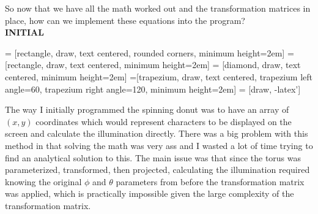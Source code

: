 \documentclass{article}
\begin{document}
\begin{flushleft}
So now that we have all the math worked out and the transformation matrices in place, how can we implement these equations into the program? \\
\textbf{INITIAL} \\
\end{flushleft}
\centering
{} = [rectangle, draw, text centered, rounded corners, minimum height=2em]
 = [rectangle, draw, text centered, minimum height=2em]
 = [diamond, draw, text centered, minimum height=2em]
=[trapezium, draw, text centered, trapezium left angle=60, trapezium right angle=120, minimum height=2em]
 = [draw, -latex']
\usetikzlibrary{shapes, arrows}
\begin{flushleft}
The way I initially programmed the spinning donut was to have an array of $(x,y)$ coordinates which would represent characters to be displayed on the screen and calculate the illumination directly. There was a big problem with this method in that solving the math was very ass and I wasted a lot of time trying to find an analytical solution to this. The main issue was that since the torus was parameterized, transformed, then projected, calculating the illumination required knowing the original $\phi$ and $\theta$ parameters from before the transformation matrix was applied, which is practically impossible given the large complexity of the transformation matrix.
\end{flushleft}
\end{document}
